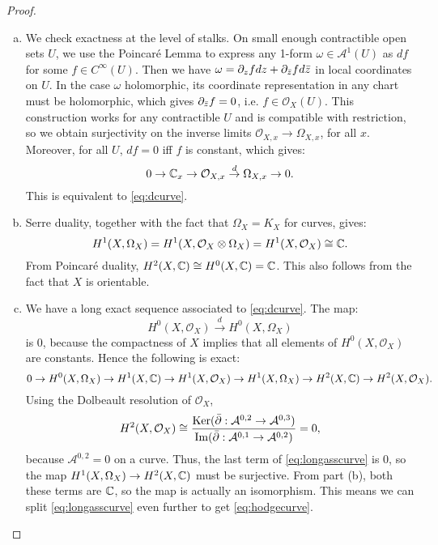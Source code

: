 \documentclass{article}
\begin{document}
\begin{proof}
\text{   }
\begin{enumerate}[(a)]
\item We check exactness at the level of stalks. On small enough contractible open sets $U$, we use 
the Poincar\'e Lemma to express any 1-form
$\omega \in \mathcal{A}^1(U)$ as $df$ for some $f \in C^{\infty}(U)$. Then we have
$\omega = \partial_z f dz + \partial_{\bar z} f d\bar z$ in local coordinates on $U$. In the case $\omega$ holomorphic,
its coordinate representation in any chart must be holomorphic, which gives $\partial_{\bar z} f = 0$, i.e. $f \in
\mathcal{O}_X(U)$. This construction works for any contractible $U$ and is compatible with restriction,
so we obtain surjectivity on the inverse limits $\mathcal{O}_{X,x} \to \Omega_{X,x}$, for all $x$. Moreover,
for all $U$, $df = 0$ iff $f$ is constant, which gives:
\[	 0 \to \mathbb{C}_x \to \mathcal{O}_{X,x} \overset{d}{\to} \Omega_{X,x} \to 0.	\]
This is equivalent to \ref{eq:dcurve}.

\item Serre duality, together with the fact that $\Omega_X = K_X$ for curves, gives:
\[	H^1(X,\Omega_X) = H^1(X, \mathcal{O}_X \otimes \Omega_X) = H^1(X, \mathcal{O}_X) \cong \mathbb{C}.	\]
From Poincar\'e duality, $H^2(X,\mathbb{C}) \cong H^0(X,\mathbb{C}) = \mathbb{C}$. This also follows from the fact that $X$ is orientable.

\item We have a long exact sequence associated to \ref{eq:dcurve}. The map:
\[	H^0(X, \mathcal{O}_X) \overset{d}{\to} H^0(X,\Omega_X)	\]
is 0, because the compactness of $X$ implies that all elements of $H^0(X, \mathcal{O}_X)$ are constants.
Hence the following is exact:
\begin{equation}
\label{eq:longasscurve}
0 \to H^0(X,\Omega_X) \to H^1(X, \mathbb{C}) \to H^1(X,\mathcal{O}_X) \to H^1(X,\Omega_X) \to H^2(X, \mathbb{C}) \to
H^2(X,\mathcal{O}_X).
\end{equation}
Using the Dolbeault resolution of $\mathcal{O}_X$,
\[	H^2(X,\mathcal{O}_X) \cong \frac{\operatorname{Ker}(\bar {\partial} : \mathcal{A}^{0,2} \to \mathcal{A}^{0,3})}{\operatorname{Im}
(\bar {\partial} : \mathcal{A}^{0,1} \to \mathcal{A}^{0,2})} = 0, \]
because $\mathcal{A}^{0,2} = 0$ on a curve. Thus, the last term of \ref{eq:longasscurve} is 0, so the map
$H^1(X,\Omega_X) \to H^2(X, \mathbb{C})$ must be surjective. From part (b), both these terms are $\mathbb{C}$, so the map
is actually an isomorphism. This means we can split \ref{eq:longasscurve} even further to get \ref{eq:hodgecurve}.


\end{enumerate}
\end{proof}
\end{document}
